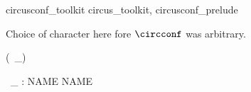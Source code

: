 
%
\begin{zsection}
  \SECTION circusconf\_toolkit \parents circus\_toolkit, circusconf\_prelude
\end{zsection}

Choice of character here fore $\circconf$ was arbitrary.
\begin{zed}
\function (\circconf~\_)
\end{zed}

\begin{gendef}[NAME]
	\circconf~\_ : NAME \fun NAME
\end{gendef}